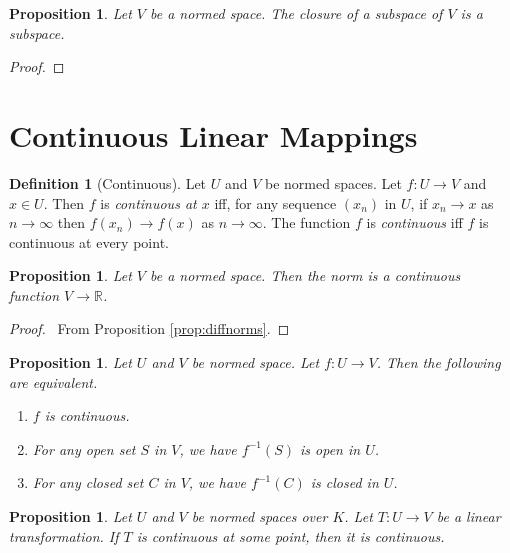 \documentclass{book}
\let\qed\relax
\newtheorem{prop}[ax]{Proposition}
\theoremstyle{definition}
\newtheorem{df}[ax]{Definition}
\newcommand{\cl}{\ensuremath{\operatorname{cl}}}
\begin{document}
\begin{prop}
Let $V$ be a normed space. The closure of a subspace of $V$ is a subspace.
\end{prop}

\begin{proof}
\pf
{}
\step{2}{\pflet{$x,y \in \cl U$ and $\alpha, \beta \in K$}}
\step{5}{$\alpha x + \beta y \in \cl U$}
\qed
\end{proof}

\section{Continuous Linear Mappings}

\begin{df}[Continuous]
Let $U$ and $V$ be normed spaces. Let $f : U \rightarrow V$ and $x \in U$. Then $f$ is \emph{continuous at $x$} iff, for any sequence $(x_n)$ in $U$, if $x_n \rightarrow x$ as $n \rightarrow \infty$ then $f(x_n) \rightarrow f(x)$ as $n \rightarrow \infty$. The function $f$ is \emph{continuous} iff $f$ is continuous at every point.
\end{df}

\begin{prop}
Let $V$ be a normed space. Then the norm is a continuous function $V \rightarrow \mathbb{R}$.
\end{prop}

\begin{proof}
\pf\ From Proposition \ref{prop:diffnorms}. \qed
\end{proof}

\begin{prop}
Let $U$ and $V$ be normed space. Let $f : U \rightarrow V$. Then the following are equivalent.
\begin{enumerate}
\item $f$ is continuous.
\item For any open set $S$ in $V$, we have $f^{-1}(S)$ is open in $U$.
\item For any closed set $C$ in $V$, we have $f^{-1}(C)$ is closed in $U$.
\end{enumerate}
\end{prop}

\begin{prop}
\label{prop:continuousonepoint}
Let $U$ and $V$ be normed spaces over $K$. Let $T : U \rightarrow V$ be a linear transformation. If $T$ is continuous at some point, then it is continuous.
\end{prop}
\end{document}
